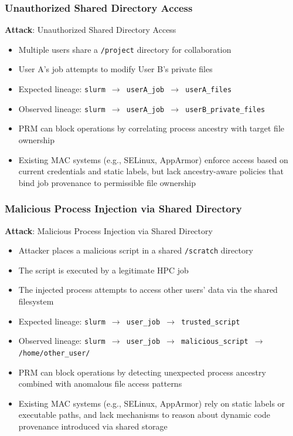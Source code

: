 \documentclass[]{sn-jnl}
\begin{document}
\subsubsection{Unauthorized Shared Directory Access}

\textbf{Attack}: Unauthorized Shared Directory Access
\begin{itemize}
\item Multiple users share a \texttt{/project} directory for collaboration
\item User A's job attempts to modify User B's private files
\item Expected lineage: \texttt{slurm $\rightarrow$ userA\_job $\rightarrow$ userA\_files}
\item Observed lineage: \texttt{slurm $\rightarrow$ userA\_job $\rightarrow$ userB\_private\_files}
\item PRM can block operations by correlating process ancestry with target file
      ownership
\item Existing MAC systems (e.g., SELinux, AppArmor) enforce access based on
      current credentials and static labels, but lack ancestry-aware policies that
      bind job provenance to permissible file ownership
\end{itemize}

\subsubsection{Malicious Process Injection via Shared Directory}

\textbf{Attack}: Malicious Process Injection via Shared Directory
\begin{itemize}
\item Attacker places a malicious script in a shared \texttt{/scratch} directory
\item The script is executed by a legitimate HPC job
\item The injected process attempts to access other users' data via the shared
      filesystem
\item Expected lineage: \texttt{slurm $\rightarrow$ user\_job $\rightarrow$ trusted\_script}
\item Observed lineage: \texttt{slurm $\rightarrow$ user\_job $\rightarrow$ malicious\_script $\rightarrow$ /home/other\_user/}
\item PRM can block operations by detecting unexpected process ancestry combined
      with anomalous file access patterns
\item Existing MAC systems (e.g., SELinux, AppArmor) rely on static labels or
      executable paths, and lack mechanisms to reason about dynamic code provenance
      introduced via shared storage
\end{itemize}
\end{document}
